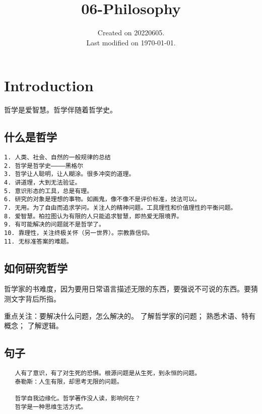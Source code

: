\documentclass[UTF8]{../RepresentationUniverse}
\begin{document}
\title{06-Philosophy}
\date{Created on 20220605.\\   Last modified on \today.}
\maketitle
\tableofcontents


\chapter{Introduction}

哲学是爱智慧。哲学伴随着哲学史。

\section{什么是哲学}

\begin{lstlisting}
1. 人类、社会、自然的一般规律的总结
2. 哲学是哲学史————黑格尔
3. 哲学让人聪明，让人糊涂。很多冲突的道理。
4. 讲道理，大到无法验证。
5. 意识形态的工具，总是有理。
6. 研究的对象是理想的事物。如画鬼，像不像不是评价标准，技法可以。
7. 无用。为了自由而追求学问。关注人的精神问题。工具理性和价值理性的平衡问题。
8. 爱智慧。柏拉图认为有限的人只能追求智慧，即热爱无限境界。
9. 有可能解决的问题就不是哲学了。
10. 靠理性，关注终极关怀（另一世界）。宗教靠信仰。
11. 无标准答案的难题。
\end{lstlisting}


\section{如何研究哲学}

哲学家的书难度，因为要用日常语言描述无限的东西，要强说不可说的东西。要猜测文字背后所指。

重点关注：要解决什么问题，怎么解决的。
了解哲学家的问题；
熟悉术语、特有概念；
了解逻辑。


\section{句子}


\begin{lstlisting}
   人有了意识，有了对生死的恐惧。根源问题是从生死，到永恒的问题。
   泰勒斯：人生有限，却思考无限的问题。

   哲学自我边缘化。哲学著作没人读，影响何在？
   哲学是一种思维生活方式。

\end{lstlisting}
\end{document}
